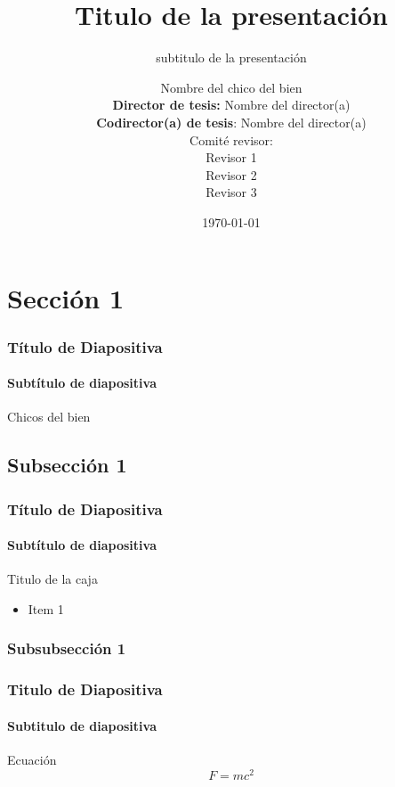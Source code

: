 \documentclass[aspectratio=169]{beamer}
\title{\normalsize{Titulo de la presentación}}
\subtitle{subtitulo de la presentación}
\date{\today}
\author[ABCD]{Nombre del chico del bien \\
	\vspace{0.5cm}
	\scriptsize{\textbf{Director de tesis:} Nombre del director(a)}\\
	\scriptsize{\textbf{Codirector(a) de tesis}: Nombre del director(a)}\\
	\vspace{0.5cm}
	Comité revisor:\\
	\vspace{0.1cm}
	\scriptsize{ Revisor 1}\\
	\scriptsize{ Revisor 2 }\\
	\scriptsize{ Revisor 3}
	\vspace{0.1cm}	
}
\begin{document}
	
	\begin{frame}[plain]
		\titlepage
	\end{frame}
	\begin{frame}
		\tableofcontents
	\end{frame}
	\section{Sección 1}
	\begin{frame}
		\frametitle{Título de Diapositiva}
		\framesubtitle{Subtítulo de diapositiva}
		Chicos del bien
	\end{frame}
	\subsection{Subsección 1}
	\begin{frame}
		\frametitle{Título de Diapositiva}
		\framesubtitle{Subtítulo de diapositiva}
		\begin{mybox}{Titulo de la caja}
			\begin{itemize}
				\item Item 1
			\end{itemize}
		\end{mybox}	
	\end{frame}
	\subsubsection{Subsubsección 1}
	\begin{frame}
		\frametitle{Titulo de Diapositiva}
		\framesubtitle{Subtitulo de diapositiva}
		\begin{mybox}{Ecuación}
			\begin{equation}
				F=mc^2
			\end{equation}
		\end{mybox}	
	\end{frame}
\end{document}
